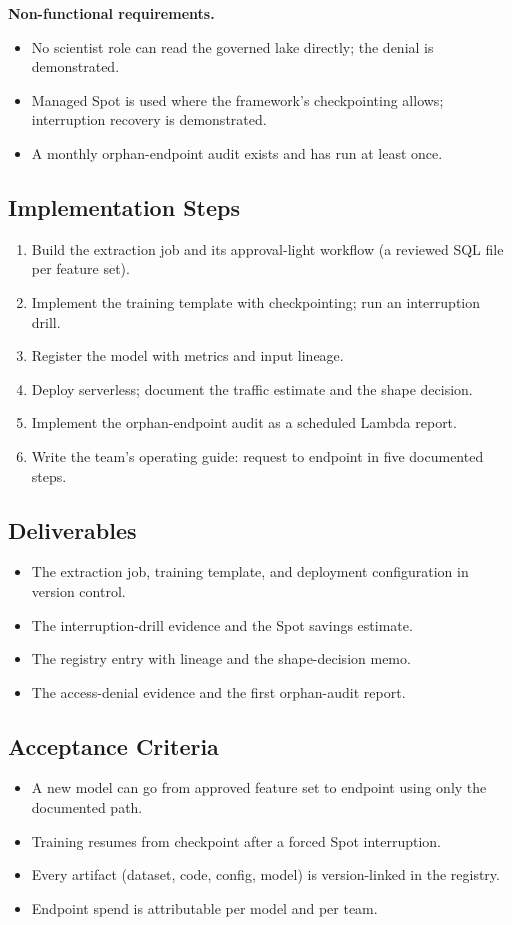 \textbf{Non-functional requirements.}
\begin{itemize}
    \item No scientist role can read the governed lake directly; the denial is demonstrated.
    \item Managed Spot is used where the framework's checkpointing allows; interruption recovery is demonstrated.
    \item A monthly orphan-endpoint audit exists and has run at least once.
\end{itemize}

\subsection*{Implementation Steps}
\begin{enumerate}
    \item Build the extraction job and its approval-light workflow (a reviewed SQL file per feature set).
    \item Implement the training template with checkpointing; run an interruption drill.
    \item Register the model with metrics and input lineage.
    \item Deploy serverless; document the traffic estimate and the shape decision.
    \item Implement the orphan-endpoint audit as a scheduled Lambda report.
    \item Write the team's operating guide: request to endpoint in five documented steps.
\end{enumerate}

\subsection*{Deliverables}
\begin{itemize}
    \item The extraction job, training template, and deployment configuration in version control.
    \item The interruption-drill evidence and the Spot savings estimate.
    \item The registry entry with lineage and the shape-decision memo.
    \item The access-denial evidence and the first orphan-audit report.
\end{itemize}

\subsection*{Acceptance Criteria}
\begin{itemize}
    \item A new model can go from approved feature set to endpoint using only the documented path.
    \item Training resumes from checkpoint after a forced Spot interruption.
    \item Every artifact (dataset, code, config, model) is version-linked in the registry.
    \item Endpoint spend is attributable per model and per team.
\end{itemize}


